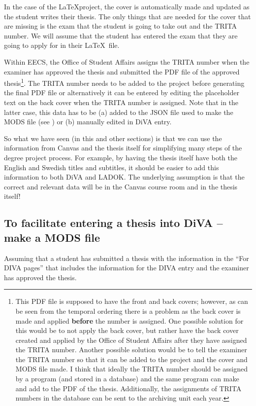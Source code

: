 In the case of the \LaTeX\;project, the cover is automatically made and updated as the student writes their thesis. The only things that are needed for the cover that are missing is the exam that the student is going to take out and the TRITA number. We will assume that the student has entered the exam that they are going to apply for in their \LaTeX~file.

Within EECS, the Office of Student Affairs assigns the TRITA number when the examiner has approved the thesis and submitted the PDF file of the approved thesis\footnote{This PDF file is supposed to have the front and back covers; however, as can be seen from the temporal ordering there is a problem as the back cover is made and applied \textbf{before} the number is assigned. One possible solution for this would be to not apply the back cover, but rather have the back cover created and applied by the Office of Student Affairs after they have assigned the TRITA number. Another possible solution would be to tell the examiner the TRITA number so that it can be added to the project and the cover and MODS file made. I think that ideally the TRITA number should be assigned by a program (and stored in a database) and the same program can make and add to the PDF of the thesis. Additionally, the assignments of TRITA numbers in the database can be sent to the archiving unit each year.}. The TRITA number needs to be \first added to the project before generating the final PDF file or \Second alternatively it can be entered by editing the placeholder text on the back cover when the TRITA number is assigned. Note that in the latter case, this data has to be (a) added to the JSON file used to make the MODS file (see ) or (b) manually edited in DiVA entry.

So what we have seen (in this and other sections) is that we can use the information from Canvas and the thesis itself for simplifying many steps of the degree project process. For example, by having the thesis itself have both the English and Swedish titles and subtitles, it should be easier to add this information to both DiVA and LADOK. The underlying assumption is that the correct and relevant data will be in the Canvas course room and in the thesis itself!
\clearpage

\subsection{To facilitate entering a thesis into DiVA – make a MODS file}
\label{sec:facilitatingDiVAentry}
Assuming that a student has submitted a thesis with the information in the “For DIVA pages” that includes the information for the DIVA entry and the examiner has approved the thesis.

